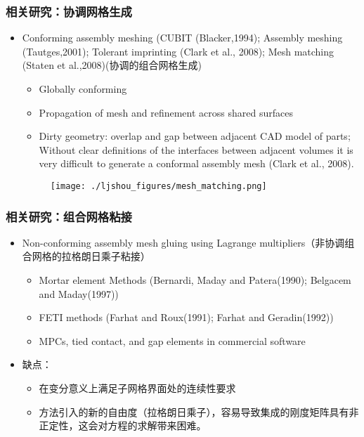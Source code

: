 \documentclass[mathserif]{beamer}
\begin{document}
\begin{CJK}{UTF8}{gkai}
		\begin{frame}
		\frametitle{相关研究：协调网格生成}
		\begin{itemize}
		  \small
		  \item Conforming assembly meshing (CUBIT (Blacker,1994); Assembly meshing (Tautges,2001); Tolerant imprinting (Clark et al., 2008); Mesh matching (Staten et al.,2008)(协调的组合网格生成)
			\begin{itemize}
			\scriptsize
			\item Globally conforming
            \item {\color{red}Propagation of mesh and refinement across shared surfaces}
            \item {\color{red}Dirty geometry}: overlap and gap between adjacent CAD model of parts; Without clear definitions of the interfaces between adjacent volumes it is very difficult to generate a conformal assembly mesh (Clark et al., 2008). 
		  	\end{itemize}
		  	\begin{figure}
		  		\texttt{[image: ./ljshou\_figures/mesh\_matching.png]}
		  	\end{figure}
		\end{itemize}
	\end{frame}

	\begin{frame}
		\frametitle{相关研究：组合网格粘接}
		\begin{itemize}
		  \item Non-conforming assembly mesh gluing using Lagrange multipliers（非协调组合网格的拉格朗日乘子粘接）
		  \begin{itemize}
		  	\scriptsize
			\item Mortar element Methods (Bernardi, Maday and Patera(1990); Belgacem and Maday(1997))
			\item FETI methods (Farhat and Roux(1991); Farhat and Geradin(1992)) 
			\item MPCs, tied contact, and gap elements in commercial software
		  \end{itemize}
		  \item 缺点： 
		    \begin{itemize}
		    \item 在变分意义上满足子网格界面处的连续性要求
		    \item 方法引入的新的自由度（拉格朗日乘子），容易导致集成的{\color{red}刚度矩阵具有非正定性}，这会对方程的求解带来困难。
		    \end{itemize}
		\end{itemize}
	\end{frame}




\end{CJK}
\end{document}
